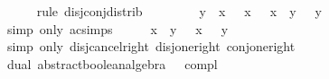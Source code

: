 \begin{isabellebody}
\ \ \ \ \isamarkupfalse%
\ {\isacharparenleft}{\kern0pt}rule\ disj{\isacharunderscore}{\kern0pt}conj{\isacharunderscore}{\kern0pt}distrib{}{\isacharparenright}{\kern0pt}\isanewline
\ \ \isamarkupfalse%
\ \isamarkupfalse%
\ {\isachardoublequoteopen}{\isasymdots}\ {\isacharequal}{\kern0pt}\ {\isacharparenleft}{\kern0pt}\isactrlbold {\isacharminus}{\kern0pt}\ y\ \isactrlbold {\isasymsqunion}\ {\isacharparenleft}{\kern0pt}x\ \isactrlbold {\isasymsqunion}\ \isactrlbold {\isacharminus}{\kern0pt}\ x{\isacharparenright}{\kern0pt}{\isacharparenright}{\kern0pt}\ \isactrlbold {\isasymsqinter}\ {\isacharparenleft}{\kern0pt}\isactrlbold {\isacharminus}{\kern0pt}\ x\ \isactrlbold {\isasymsqunion}\ {\isacharparenleft}{\kern0pt}y\ \isactrlbold {\isasymsqunion}\ \isactrlbold {\isacharminus}{\kern0pt}\ y{\isacharparenright}{\kern0pt}{\isacharparenright}{\kern0pt}{\isachardoublequoteclose}\isanewline
\ \ \ \ \isamarkupfalse%
\ {\isacharparenleft}{\kern0pt}simp\ only{\isacharcolon}{\kern0pt}\ ac{\isacharunderscore}{\kern0pt}simps{\isacharparenright}{\kern0pt}\isanewline
\ \ \isamarkupfalse%
\ \isamarkupfalse%
\ {\isachardoublequoteopen}{\isacharparenleft}{\kern0pt}x\ \isactrlbold {\isasymsqinter}\ y{\isacharparenright}{\kern0pt}\ \isactrlbold {\isasymsqunion}\ {\isacharparenleft}{\kern0pt}\isactrlbold {\isacharminus}{\kern0pt}\ x\ \isactrlbold {\isasymsqunion}\ \isactrlbold {\isacharminus}{\kern0pt}\ y{\isacharparenright}{\kern0pt}\ {\isacharequal}{\kern0pt}\ \isanewline
\ \ \ \ \isamarkupfalse%
\ {\isacharparenleft}{\kern0pt}simp\ only{\isacharcolon}{\kern0pt}\ disj{\isacharunderscore}{\kern0pt}cancel{\isacharunderscore}{\kern0pt}right\ disj{\isacharunderscore}{\kern0pt}one{\isacharunderscore}{\kern0pt}right\ conj{\isacharunderscore}{\kern0pt}one{\isacharunderscore}{\kern0pt}right{\isacharparenright}{\kern0pt}\isanewline
{}\isamarkupfalse%
%
\endisatagproof
{\isafoldproof}%
%
\isadelimproof
\isanewline
%
\endisadelimproof
\isanewline
{}\isamarkupfalse%
\isanewline
{}\isanewline
\isanewline
{}\isamarkupfalse%
\ dual{\isacharcolon}{\kern0pt}\ abstract{\isacharunderscore}{\kern0pt}boolean{\isacharunderscore}{\kern0pt}algebra\ {\isacartoucheopen}{\isacharparenleft}{\kern0pt}\isactrlbold {\isasymsqunion}{\isacharparenright}{\kern0pt}{\isacartoucheclose}\ {\isacartoucheopen}{\isacharparenleft}{\kern0pt}\isactrlbold {\isasymsqinter}{\isacharparenright}{\kern0pt}{\isacartoucheclose}\ compl\ {\isacartoucheopen}\ {\isacartoucheopen}\isanewline

\end{isabellebody}

